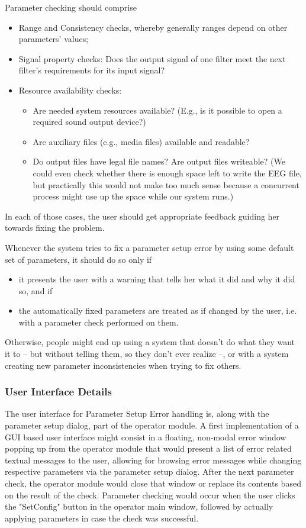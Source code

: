\documentclass[12pt,a4paper]{article}
\begin{document}
Parameter checking should comprise
\begin{itemize}
  \item{Range and Consistency checks,}
        whereby generally ranges depend on other parameters' values;
  \item{Signal property checks:}
        Does the output signal of one filter meet the next filter's
        requirements for its input signal?
  \item{Resource availability checks:}
  \begin{itemize}  
    \item{Are needed system resources available?}
          (E.g., is it possible to open a required sound output device?)
    \item{Are auxiliary files (e.g., media files) available and readable?}
    \item{Do output files have legal file names? Are output files writeable?}
       (We could even check whether there is enough
       space left to write the EEG file, but practically this
       would not make too much sense because a concurrent process
       might use up the space while our system runs.)
  \end{itemize}
\end{itemize}

In each of those cases, the user should get appropriate
feedback guiding her towards fixing the problem.

Whenever the system tries to fix a parameter setup error
by using some default set of parameters, it should do so
only if
\begin{itemize}
\item it presents the user with a warning that tells her
what it did and why it did so, and if
\item the automatically fixed parameters are treated as if
changed by the user, i.e. with a parameter check performed
on them.
\end{itemize}
Otherwise, people might end up using a system that doesn't
do what they want it to -- but without telling them, so they
don't ever realize --, or with a system creating new parameter
inconsistencies when trying to fix others.

\subsubsection{User Interface Details}

The user interface for Parameter Setup Error handling is,
along with the parameter setup dialog, part of the operator
module. A first implementation of a GUI based user interface might
consist in a floating, non-modal error window popping up from the operator
module that would present a list of error related textual
messages to the user, allowing for browsing error messages
while changing respective parameters via the parameter setup
dialog. After the next parameter check, the operator module would close
that window or replace its contents based on the result of the check.
Parameter checking would occur when the user clicks the "SetConfig"
button in the operator main window, followed by actually applying
parameters in case the check was successful.
\end{document}
